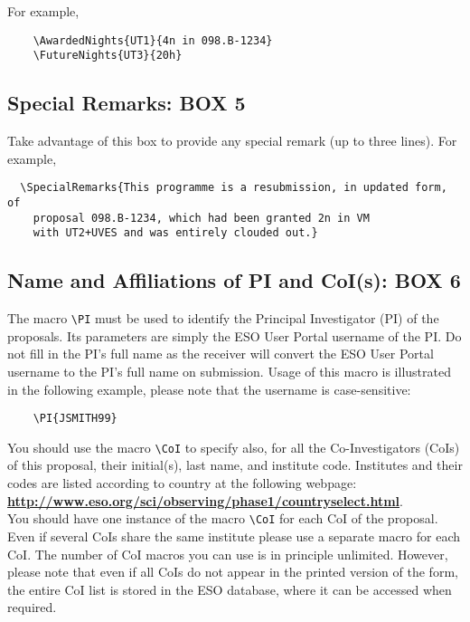 \documentclass{article}
\begin{document}
For example,
\begin{verbatim}
    \AwardedNights{UT1}{4n in 098.B-1234}
    \FutureNights{UT3}{20h}
\end{verbatim} 

\subsection{Special Remarks:  {\bf BOX 5}}

Take advantage of this box to provide any special remark (up to three
lines).  For example,
\begin{verbatim}
  \SpecialRemarks{This programme is a resubmission, in updated form, of
    proposal 098.B-1234, which had been granted 2n in VM
    with UT2+UVES and was entirely clouded out.}
\end{verbatim}

\subsection{Name and Affiliations of PI and CoI(s): {\bf BOX 6}}

The macro \verb|\PI| must be used to identify the Principal
Investigator (PI) of the proposals. Its parameters are simply the 
ESO User Portal username of the PI. Do not fill in the PI's full
name as the receiver will convert the ESO User Portal username
to the PI's full name on submission.
Usage of this macro is illustrated in the following example, please note that the username is case-sensitive:
\begin{verbatim}
    \PI{JSMITH99}
\end{verbatim}

You should use the macro \verb|\CoI| to specify also, for
all the Co-Investigators (CoIs) of this proposal, their initial(s),
last name, and institute code. Institutes and their codes are listed 
according to country at the following webpage:\\
\href{http://www.eso.org/sci/observing/phase1/countryselect.html}
{\bf\underline{http://www.eso.org/sci/observing/phase1/countryselect.html}}.\\
You should have one instance of the macro \verb|\CoI| for each CoI of the
proposal. Even if several CoIs share the same institute
please use a separate macro for each CoI. The number of CoI macros you can 
use is in principle unlimited. However, please note that 
even if all CoIs do not appear in the printed version of the form,
the entire  CoI list is stored in the ESO database, where it
can be accessed when required.
\end{document}
